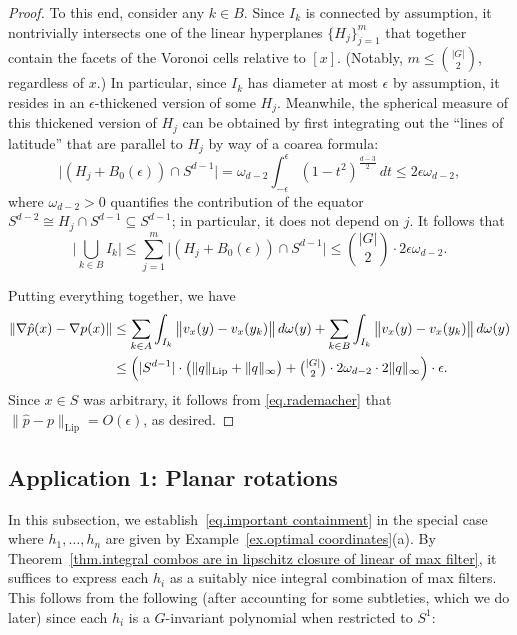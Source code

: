 \documentclass{article}
\theoremstyle{plain}
\theoremstyle{definition}
\begin{document}
\begin{proof}
To this end, consider any $k\in B$.
Since $I_k$ is connected by assumption, it nontrivially intersects one of the linear hyperplanes $\{H_j\}_{j=1}^m$ that together contain the facets of the Voronoi cells relative to $[x]$.
(Notably, $m\leq\binom{|G|}{2}$, regardless of $x$.)
In particular, since $I_k$ has diameter at most $\epsilon$ by assumption, it resides in an $\epsilon$-thickened version of some $H_j$.
Meanwhile, the spherical measure of this thickened version of $H_j$ can be obtained by first integrating out the ``lines of latitude'' that are parallel to $H_j$ by way of a coarea formula:
\[
\big|(H_j+B_0(\epsilon))\cap S^{d-1}\big|
=\omega_{d-2}\int_{-\epsilon}^\epsilon (1-t^2)^{\frac{d-3}{2}}\,dt
\leq 2\epsilon\omega_{d-2},
\]
where $\omega_{d-2}>0$ quantifies the contribution of the equator $S^{d-2} \cong H_j\cap S^{d-1}\subseteq S^{d-1}$; in particular, it does not depend on $j$. 
It follows that
\[
\bigg|\bigcup_{k\in B}I_k\bigg|
\leq\sum_{j=1}^m\big|(H_j+B_0(\epsilon))\cap S^{d-1}\big|
\leq\binom{|G|}{2}\cdot2\epsilon\omega_{d-2}.
\]

Putting everything together, we have
\begin{align*}
\|\nabla\hat{p}(x)-\nabla p(x)\|
&\leq\sum_{k\in A} \int_{I_k} \big\| v_x(y)-v_x(y_k)\big\|\,d\omega(y)+\sum_{k\in B} \int_{I_k} \big\| v_x(y)-v_x(y_k)\big\|\,d\omega(y)\\
&\leq \Big(|S^{d-1}|\cdot\big(\|q\|_{\operatorname{Lip}}+\|q\|_{\infty}\big)+\tbinom{|G|}{2}\cdot 2\omega_{d-2}\cdot 2\|q\|_\infty\Big)\cdot\epsilon.
\end{align*}
Since $x\in S$ was arbitrary, it follows from \eqref{eq.rademacher} that $\|\hat{p}-p\|_{\operatorname{Lip}}=O(\epsilon)$, as desired.
\end{proof}

\subsection{Application 1: Planar rotations}
\label{subsec:planar}

In this subsection, we establish~\eqref{eq.important containment} in the special case where $h_1,\ldots,h_n$ are given by Example~\ref{ex.optimal coordinates}(a).
By Theorem~\ref{thm.integral combos are in lipschitz closure of linear of max filter}, it suffices to express each $h_i$ as a suitably nice integral combination of max filters.
This follows from the following (after accounting for some subtleties, which we do later) since each $h_i$ is a $G$-invariant polynomial when restricted to $S^1$:
\end{document}
